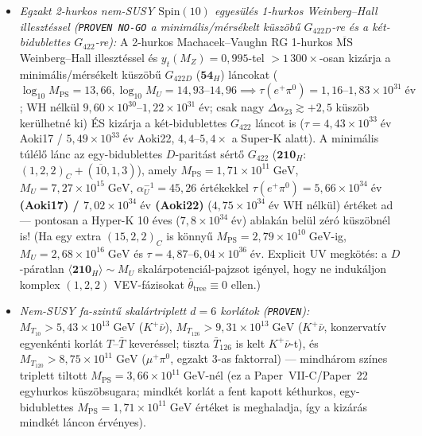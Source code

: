 \documentclass[11pt,a4paper]{article}
\begin{document}
\begin{enumerate}
\begin{itemize}
        \item \emph{Egzakt 2-hurkos nem-SUSY $\mathrm{Spin}(10)$ egyesülés 1-hurkos Weinberg--Hall illesztéssel (\texttt{PROVEN NO-GO} a minimális/mérsékelt küszöbű $G_{422D}$-re és a két-bidublettes $G_{422}$-re):} A 2-hurkos Machacek--Vaughn RG \cite{MachacekVaughn} 1-hurkos $\overline{\mathrm{MS}}$ Weinberg--Hall illesztéssel és $y_t(M_Z)=0{,}995$-tel $>1\,300\times$-osan kizárja a minimális/mérsékelt küszöbű $G_{422D}$ ($\mathbf{54}_H$) láncokat ($\log_{10} M_{\mathrm{PS}}=13{,}66, \log_{10} M_U=14{,}93\text{--}14{,}96 \implies \tau(e^+\pi^0)=1{,}16\text{--}1{,}83\times 10^{31}\;\text{év}$; WH nélkül $9{,}60\times 10^{30}\text{--}1{,}22\times 10^{31}\;\text{év}$; csak nagy $\Delta\alpha_{23}\gtrsim +2{,}5$ küszöb kerülhetné ki) ÉS kizárja a két-bidublettes $G_{422}$ láncot is ($\tau = 4{,}43\times 10^{33}\;\text{év}$ Aoki17 / $5{,}49\times 10^{33}\;\text{év}$ Aoki22, $4{,}4\text{--}5{,}4\times$ a Super-K alatt). A minimális túlélő lánc az egy-bidublettes $D$-paritást sértő $G_{422}$ ($\mathbf{210}_H$: $(1,2,2)_C + (\overline{10},1,3)$), amely $M_{\mathrm{PS}}=1{,}71\times 10^{11}\;\mathrm{GeV}$, $M_U=7{,}27\times 10^{15}\;\mathrm{GeV}$, $\alpha_U^{-1}=45{,}26$ értékekkel \textbf{$\tau(e^+\pi^0)=5{,}66\times 10^{34}\;\text{év}$ (Aoki17) / $7{,}02\times 10^{34}\;\text{év}$ (Aoki22)} ($4{,}75\times 10^{34}\;\text{év}$ WH nélkül) értéket ad --- pontosan a Hyper-K 10 éves ($7{,}8\times 10^{34}\;\text{év}$) ablakán belül zéró küszöbnél is! (Ha egy extra $(15,2,2)_C$ is könnyű $M_{\mathrm{PS}}=2{,}79\times 10^{10}\;\mathrm{GeV}$-ig, $M_U = 2{,}68\times 10^{16}\;\mathrm{GeV}$ és $\tau = 4{,}87\text{--}6{,}04\times 10^{36}\;\text{év}$. Explicit UV megkötés: a $D$-páratlan $\langle\mathbf{210}_H\rangle\sim M_U$ skalárpotenciál-pajzsot igényel, hogy ne indukáljon komplex $(1,2,2)$ VEV-fázisokat $\bar\theta_{\mathrm{tree}}\equiv 0$ ellen.)
        \item \emph{Nem-SUSY fa-szintű skalártriplett $d=6$ korlátok (\texttt{PROVEN}):} $M_{T_{10}} > 5{,}43\times 10^{13}\;\mathrm{GeV}$ ($K^+\bar\nu$), $M_{T_{126}} > 9{,}31\times 10^{13}\;\mathrm{GeV}$ ($K^+\bar\nu$, konzervatív egyenkénti korlát $T$--$\bar T$ keveréssel; tiszta $\bar T_{126}$ is kelt $K^+\bar\nu$-t), és $M_{T_{120}} > 8{,}75\times 10^{11}\;\mathrm{GeV}$ ($\mu^+\pi^0$, egzakt $3$-as faktorral) --- mindhárom színes triplett tiltott $M_{\mathrm{PS}}=3{,}66\times 10^{11}\;\mathrm{GeV}$-nél (ez a Paper~VII-C/Paper~22 egyhurkos küszöbsugara; mindkét korlát a fent kapott kéthurkos, egy-bidublettes $M_{\mathrm{PS}}=1{,}71\times 10^{11}\;\mathrm{GeV}$ értéket is meghaladja, így a kizárás mindkét láncon érvényes).

\end{itemize}
\end{enumerate}
\end{document}
